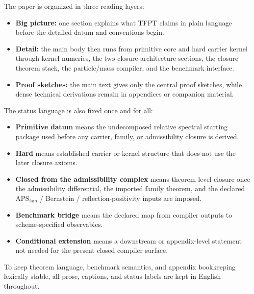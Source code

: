 \documentclass[11pt,a4paper]{article}
\theoremstyle{definition}
\theoremstyle{remark}
\newcommand{\APSfam}{\mathrm{APS}_{\mathrm{fam}}}
\begin{document}
The paper is organized in three reading layers:
\begin{itemize}[leftmargin=1.5em, topsep=3pt, itemsep=2pt]
    \item \textbf{Big picture:} one section explains what TFPT claims in plain language before the detailed datum and conventions begin.
    \item \textbf{Detail:} the main body then runs from primitive core and hard carrier kernel through kernel numerics, the two closure-architecture sections, the closure theorem stack, the particle/mass compiler, and the benchmark interface.
    \item \textbf{Proof sketches:} the main text gives only the central proof sketches, while dense technical derivations remain in appendices or companion material.
\end{itemize}
The status language is also fixed once and for all:
\begin{itemize}[leftmargin=1.5em, topsep=3pt, itemsep=2pt]
    \item \textbf{Primitive datum} means the undecomposed relative spectral starting package used before any carrier, family, or admissibility closure is derived.
    \item \textbf{Hard} means established carrier or kernel structure that does not use the later closure axioms.
    \item \textbf{Closed from the admissibility complex} means theorem-level closure once the admissibility differential, the imported family theorem, and the declared $\APSfam$ / Bernstein / reflection-positivity inputs are imposed.
    \item \textbf{Benchmark bridge} means the declared map from compiler outputs to scheme-specified observables.
    \item \textbf{Conditional extension} means a downstream or appendix-level statement not needed for the present closed compiler surface.
\end{itemize}
To keep theorem language, benchmark semantics, and appendix bookkeeping lexically stable, all prose, captions, and status labels are kept in English throughout.
\end{document}
